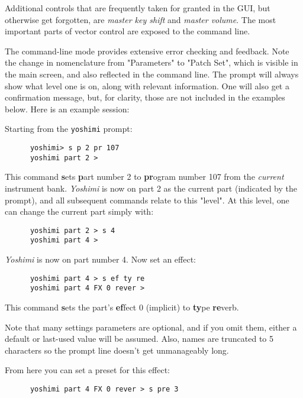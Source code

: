    Additional controls that are frequently taken for granted in the GUI, but
   otherwise get forgotten, are \textsl{master key shift} and \textsl{master
   volume}.  The most important parts of vector control are exposed to the
   command line.

   The command-line mode provides extensive error checking and feedback.
   Note the change in nomenclature from "Parameters" to "Patch Set", which is
   visible in the main screen, and also reflected in the command line.
   The prompt will always show what level
   one is on, along with relevant information.
   One will also get a confirmation message, but, for clarity,
   those are not included in the examples below.
   Here is an example session:

   Starting from the \texttt{yoshimi} prompt:

   \begin{verbatim}
      yoshimi> s p 2 pr 107
      yoshimi part 2 >
   \end{verbatim}

   This command \textbf{s}ets \textbf{p}art number 2 to \textbf{pr}ogram
   number 107 from the \textsl{current} instrument bank.
   \textsl{Yoshimi} is now on part 2 as the current part (indicated by the
   prompt), and all subsequent commands relate to this "level".
   At this level, one can change the current part simply with:

   \begin{verbatim}
      yoshimi part 2 > s 4
      yoshimi part 4 >
   \end{verbatim}

   \textsl{Yoshimi} is now on part number 4. Now set an effect:

   \begin{verbatim}
      yoshimi part 4 > s ef ty re
      yoshimi part 4 FX 0 rever >
   \end{verbatim}

   This command \textbf{s}ets the part's \textbf{ef}fect 0 (implicit) to
   \textbf{ty}pe \textbf{re}verb.

   Note that many settings parameters are optional, and if you omit them,
   either a default or last-used value will be assumed. Also, names are
   truncated to 5 characters so the prompt line doesn't get unmanageably long.

   From here you can set a preset for this effect:

   \begin{verbatim}
      yoshimi part 4 FX 0 rever > s pre 3
   \end{verbatim}

